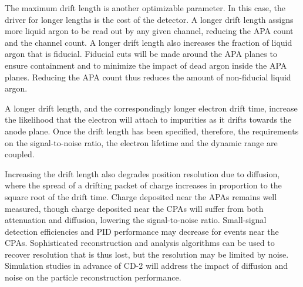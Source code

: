 The maximum drift length is another optimizable parameter.  In
this case, the driver for longer lengths is the cost of the detector.
A longer drift length assigns more liquid argon to be read out by any
given channel, reducing the APA count and the channel count.  A longer
drift length also increases the fraction of liquid argon that is
fiducial.  Fiducial cuts will be made around the APA planes
to ensure containment and to minimize the impact of dead argon inside the APA
planes.  Reducing the APA count thus reduces the amount of non-fiducial
liquid argon.  

A longer drift length, and the correspondingly longer electron drift time, increase the
likelihood that the electron will attach to impurities as it drifts towards the
anode plane.  Once the drift length has been specified, therefore, the requirements on the 
signal-to-noise ratio, the electron lifetime and the dynamic range are coupled.

Increasing the drift length also degrades position resolution due to
diffusion, where the spread of a drifting packet of charge increases
in proportion to the square root of the drift time.  Charge deposited
near the APAs remains well measured, though charge deposited near the
CPAs will suffer from both attenuation and diffusion, lowering the
signal-to-noise ratio.  Small-signal detection efficiencies and PID
performance may decrease for events near the CPAs.  Sophisticated
reconstruction and analysis algorithms can be used to recover
resolution that is thus lost, but the resolution may be limited by
noise.  Simulation studies in advance of CD-2 will address the impact
of diffusion and noise on the particle reconstruction performance.
